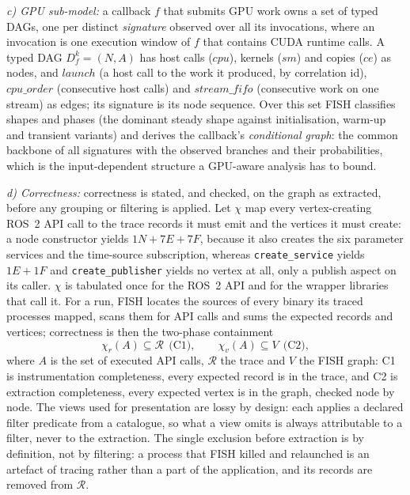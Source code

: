 \emph{c) GPU sub-model:} a callback $f$ that submits GPU work owns a set
of typed DAGs, one per distinct \emph{signature} observed over all its
invocations, where an invocation is one execution window of $f$ that
contains CUDA runtime calls. A typed DAG $D_f^k=(N,A)$ has host calls
($\mathit{cpu}$), kernels ($\mathit{sm}$) and copies ($\mathit{ce}$) as
nodes, and $\mathit{launch}$ (a host call to the work it produced, by
correlation id), $\mathit{cpu\_order}$ (consecutive host calls) and
$\mathit{stream\_fifo}$ (consecutive work on one stream) as edges; its
signature is its node sequence. Over this set FISH classifies shapes
and phases (the dominant steady shape against initialisation, warm-up
and transient variants) and derives the callback's \emph{conditional
graph}: the common backbone of all signatures with the observed
branches and their probabilities, which is the input-dependent
structure a GPU-aware analysis has to bound.

\emph{d) Correctness:} correctness is stated, and checked, on the graph
as extracted, before any grouping or filtering is applied. Let $\chi$ map every vertex-creating ROS~2 API call to
the trace records it must emit and the vertices it must create: a node
constructor yields $1N+7E+7F$, because it also creates the six parameter
services and the time-source subscription, whereas
\texttt{create\_service} yields $1E+1F$ and \texttt{create\_publisher}
yields no vertex at all, only a publish aspect on its caller. $\chi$ is
tabulated once for the ROS~2 API and for the wrapper libraries that call
it. For a run, FISH locates the sources of every binary its traced
processes mapped, scans them for API calls and sums the expected records
and vertices; correctness is then the two-phase containment
\[
\chi_r(A)\subseteq\mathcal{R}\ \ \text{(C1)},\qquad
\chi_v(A)\subseteq V\ \ \text{(C2)},
\]
where $A$ is the set of executed API calls, $\mathcal{R}$ the trace and
$V$ the FISH graph: C1 is instrumentation completeness, every expected
record is in the trace, and C2 is extraction completeness, every
expected vertex is in the graph, checked node by node. The views used for presentation are lossy by design: each
applies a declared filter predicate from a catalogue, so what a view
omits is always attributable to a filter, never to the extraction. The single exclusion before extraction is by
definition, not by filtering: a process that FISH killed and relaunched
is an artefact of tracing rather than a part of the application, and its
records are removed from $\mathcal{R}$.
